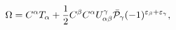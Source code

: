 \begin{equation}\label{4.29}
\Omega=C^\alpha
T_\alpha+\frac{1}{2}C^\beta C^\alpha U^\gamma_{\alpha\beta} \bar{\cal
P}_\gamma(-1)^{\varepsilon_\beta+\varepsilon_\gamma},
\end{equation}

